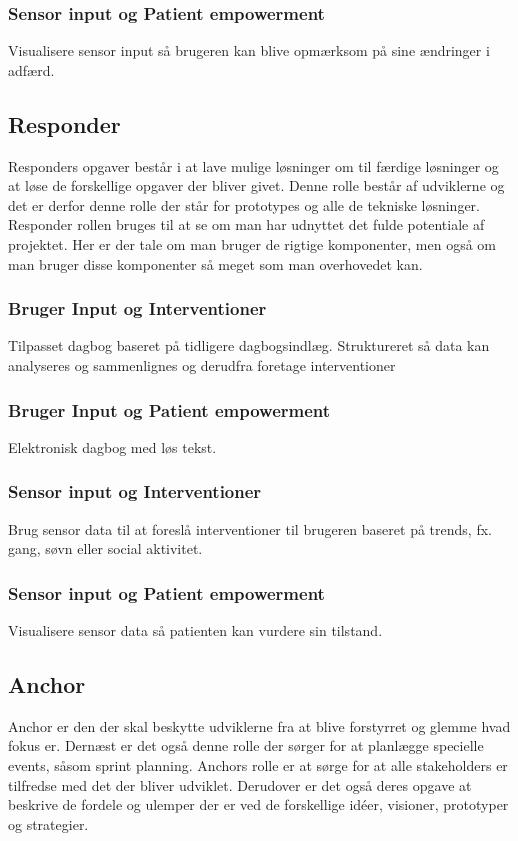 \subsubsection*{Sensor input og Patient empowerment}
Visualisere sensor input så brugeren kan blive opmærksom på sine ændringer i adfærd.

\subsection{Responder}
Responders opgaver består i at lave mulige løsninger om til færdige løsninger og at løse de forskellige opgaver der bliver givet.
Denne rolle består af udviklerne og det er derfor denne rolle der står for prototypes og alle de tekniske løsninger.
Responder rollen bruges til at se om man har udnyttet det fulde potentiale af projektet.
Her er der tale om man bruger de rigtige komponenter, men også om man bruger disse komponenter så meget som man overhovedet kan. 

\subsubsection*{Bruger Input og Interventioner}
Tilpasset dagbog baseret på tidligere dagbogsindlæg.
Struktureret så data kan analyseres og sammenlignes og derudfra foretage interventioner
\subsubsection*{Bruger Input og Patient empowerment}
Elektronisk dagbog med løs tekst.
\subsubsection*{Sensor input og Interventioner} 
Brug sensor data til at foreslå interventioner til brugeren baseret på trends, fx. gang, søvn eller social aktivitet.
\subsubsection*{Sensor input og Patient empowerment}
Visualisere sensor data så patienten kan vurdere sin tilstand.

\subsection{Anchor}
Anchor er den der skal beskytte udviklerne fra at blive forstyrret og glemme hvad fokus er.
Dernæst er det også denne rolle der sørger for at planlægge specielle events, såsom sprint planning.
Anchors rolle er at sørge for at alle stakeholders er tilfredse med det der bliver udviklet.
Derudover er det også deres opgave at beskrive de fordele og ulemper der er ved de forskellige idéer, visioner, prototyper og strategier.

